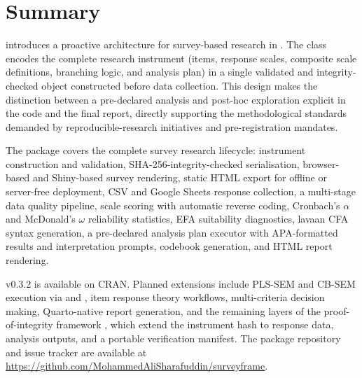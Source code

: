 \documentclass[article]{jss}\usepackage[]{graphicx}\usepackage[]{xcolor}
\begin{document}
\section{Summary}
\label{sec:summary}

 introduces a proactive architecture for survey-based
research in . The  class encodes the complete
research instrument (items, response scales, composite scale
definitions, branching logic, and analysis plan) in a single validated
and integrity-checked object constructed before data collection. This
design makes the distinction between a pre-declared analysis and
post-hoc exploration explicit in the code and the final report,
directly supporting the methodological standards demanded by
reproducible-research initiatives and pre-registration mandates.

The package covers the complete survey research lifecycle: instrument
construction and validation, SHA-256-integrity-checked serialisation,
browser-based and Shiny-based survey rendering, static HTML export for
offline or server-free deployment, CSV and Google Sheets response
collection, a multi-stage data quality pipeline, scale scoring with
automatic reverse coding, Cronbach's $\alpha$ and McDonald's $\omega$
reliability statistics, EFA suitability diagnostics, lavaan CFA syntax
generation, a pre-declared analysis plan executor with APA-formatted
results and interpretation prompts, codebook generation, and HTML
report rendering.

 v0.3.2 is available on CRAN. Planned extensions
include PLS-SEM and CB-SEM execution via  and ,
item response theory workflows, multi-criteria decision making,
Quarto-native report generation, and the remaining layers of the
proof-of-integrity framework \citep{sharafuddin2026ssr}, which extend
the instrument hash to response data, analysis outputs, and a portable
verification manifest. The package repository and issue
tracker are available at
\url{https://github.com/MohammedAliSharafuddin/surveyframe}.




\end{document}
